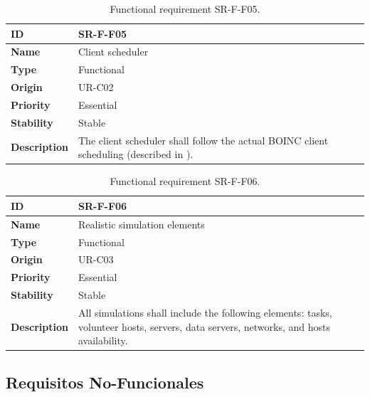 \begin{center}
\begin{table}[htbp]
\centering
\begin{tabular}{@{}p{2.5cm} p{9cm}@{}} 
\toprule
\textbf{ID} 				& SR-F-F05\\
\midrule
\textbf{Name} 			& Client scheduler \\
\midrule
\textbf{Type} 			& Functional \\
\midrule
\textbf{Origin} 			& UR-C02 \\
\midrule
\textbf{Priority}		& Essential \\
\midrule
\textbf{Stability} 		& Stable \\
\midrule
\textbf{Description} 	& The client scheduler shall follow the actual BOINC client \gls{scheduling} (described in \cite{anderson2007}). \\
\bottomrule
\end{tabular}
\caption{Functional requirement SR-F-F05.}
\label{tab:srff05}
\end{table}
\end{center}

\begin{center}
\begin{table}[htbp]
\centering
\begin{tabular}{@{}p{2.5cm} p{9cm}@{}} 
\toprule
\textbf{ID} 				& SR-F-F06\\
\midrule
\textbf{Name} 			& Realistic simulation elements \\
\midrule
\textbf{Type} 			& Functional \\
\midrule
\textbf{Origin} 			& UR-C03 \\
\midrule
\textbf{Priority}		& Essential \\
\midrule
\textbf{Stability} 		& Stable \\
\midrule
\textbf{Description} 	& All simulations shall include the following elements: tasks, volunteer hosts, servers, data servers, networks, and hosts availability. \\
\bottomrule
\end{tabular}
\caption{Functional requirement SR-F-F06.}
\label{tab:srff06}
\end{table}
\end{center}

\fi

\subsection{Requisitos No-Funcionales}

